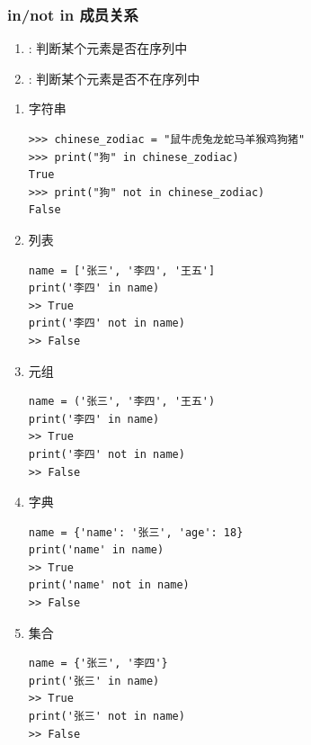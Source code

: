 \subsubsection{in/not in 成员关系}
\begin{enumerate}[label=\arabic*)]
    \item {}: 判断某个元素是否在序列中
    \item {}: 判断某个元素是否不在序列中
\end{enumerate}

\begin{enumerate}[label=\arabic*)]
    \item 字符串
\begin{lstlisting}[style=demostyle,numbers=none]
>>> chinese_zodiac = "鼠牛虎兔龙蛇马羊猴鸡狗猪"
>>> print("狗" in chinese_zodiac)
True
>>> print("狗" not in chinese_zodiac)
False
\end{lstlisting}

    \item 列表
\begin{lstlisting}[style=demostyle,numbers=none]
name = ['张三', '李四', '王五']
print('李四' in name)
>> True
print('李四' not in name)
>> False
\end{lstlisting}

    \item 元组
\begin{lstlisting}[style=demostyle,numbers=none]
name = ('张三', '李四', '王五')
print('李四' in name)
>> True
print('李四' not in name)
>> False
\end{lstlisting}

    \item 字典
\begin{lstlisting}[style=demostyle,numbers=none]
name = {'name': '张三', 'age': 18}
print('name' in name)
>> True
print('name' not in name)
>> False
\end{lstlisting}

    \item 集合
\begin{lstlisting}[style=demostyle,numbers=none]
name = {'张三', '李四'}
print('张三' in name)
>> True
print('张三' not in name)
>> False
\end{lstlisting}

\end{enumerate}



